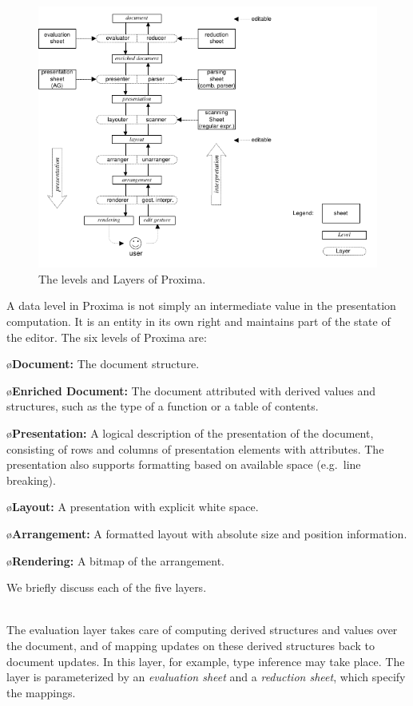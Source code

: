 \documentclass[10pt]{article}
\begin{document}
\begin{figure}
\begin{center}
\includegraphics[width=12cm]{images/LayerOverview}
\end{center}
\caption{The levels and Layers of Proxima.}
\label{fig:levelsAndLayers}
\end{figure}

A data level in Proxima is not simply an intermediate value in the presentation computation. It is an entity in its own right and maintains part of the state of the editor. The six levels of Proxima are:


\bl
\o {\bf Document:} The document structure.

\o {\bf Enriched Document:} The document attributed with derived values and structures, such as the type of a function or a table of contents.

\o{\bf Presentation:} A logical description of the presentation of the document, consisting of rows and columns of presentation elements with attributes. The presentation also supports formatting based on available space (e.g.\ line breaking).

\o{\bf Layout:} A presentation with explicit white space. 

\o{\bf Arrangement:} A formatted layout with absolute size and position information.

\o{\bf Rendering:} A bitmap of the arrangement.
\el


\bc
We briefly discuss each of the five layers.

\\
The evaluation layer takes care of computing derived structures and values over the document, and of mapping updates on these derived structures back to document updates. In this layer, for example, type inference may take place. The layer is parameterized by an {\em evaluation sheet} and a {\em reduction sheet}, which specify the mappings. 
\end{document}
